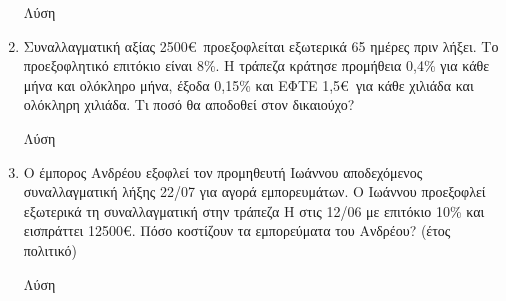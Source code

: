 \documentclass[a4paper,12pt]{article}
\begin{document}
\begin{enumerate}
\hspace{.15\textwidth}Λύση

\vspace{3cm}


\item Συναλλαγματική αξίας 2500\euro\ προεξοφλείται εξωτερικά 65 ημέρες πριν λήξει. Το προεξοφλητικό επιτόκιο είναι 8\%. Η τράπεζα κράτησε προμήθεια 0,4\% για κάθε μήνα και ολόκληρο μήνα, έξοδα 0,15\% και ΕΦΤΕ 1,5\euro\ για κάθε χιλιάδα και ολόκληρη χιλιάδα. Τι ποσό θα αποδοθεί στον δικαιούχο?

\hspace{.15\textwidth}Λύση

\vspace{3cm}

\newpage

\item Ο έμπορος Ανδρέου εξοφλεί τον προμηθευτή Ιωάννου αποδεχόμενος συναλλαγματική λήξης 22/07 για αγορά εμπορευμάτων. Ο Ιωάννου προεξοφλεί εξωτερικά τη συναλλαγματική στην τράπεζα Η στις 12/06 με επιτόκιο 10\% και εισπράττει 12500\euro. Πόσο κοστίζουν τα εμπορεύματα του Ανδρέου? (έτος πολιτικό)

\hspace{.15\textwidth}Λύση

\vspace{3cm}

\end{enumerate}
\end{document}
